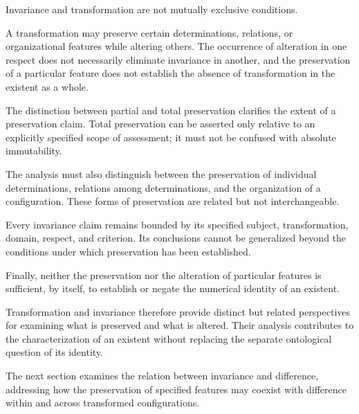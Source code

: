 Invariance and transformation are not mutually
exclusive conditions.

A transformation may preserve certain determinations,
relations, or organizational features while altering
others. The occurrence of alteration in one respect
does not necessarily eliminate invariance in another,
and the preservation of a particular feature does
not establish the absence of transformation in
the existent as a whole.

The distinction between partial and total preservation
clarifies the extent of a preservation claim.
Total preservation can be asserted only relative
to an explicitly specified scope of assessment;
it must not be confused with absolute immutability.

The analysis must also distinguish between the
preservation of individual determinations, relations
among determinations, and the organization of a
configuration. These forms of preservation are
related but not interchangeable.

Every invariance claim remains bounded by its
specified subject, transformation, domain, respect,
and criterion. Its conclusions cannot be generalized
beyond the conditions under which preservation
has been established.

Finally, neither the preservation nor the alteration
of particular features is sufficient, by itself,
to establish or negate the numerical identity
of an existent.

Transformation and invariance therefore provide
distinct but related perspectives for examining
what is preserved and what is altered. Their
analysis contributes to the characterization of
an existent without replacing the separate
ontological question of its identity.

The next section examines the relation between
invariance and difference, addressing how the
preservation of specified features may coexist
with difference within and across transformed
configurations.


